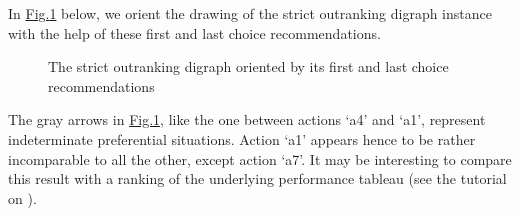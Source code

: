 \documentclass[a4paper,12pt,english]{sphinxhowto}
\let\sphinxpxdimen\pdfpxdimen\else\newdimen\sphinxpxdimen
\begin{document}
\sphinxAtStartPar
In \hyperref[\detokenize{pearls:bestworstorientation}]{Fig.\@ \ref{\detokenize{pearls:bestworstorientation}}} below, we orient the drawing of the strict outranking digraph instance with the help of these first and last choice recommendations.

\begin{sphinxVerbatim}[commandchars=\\\{\},numbers=left,firstnumber=1,stepnumber=1]
                   \PYG{p}{[}\PYG{p}{]}
                   \PYG{p}{[}\PYG{p}{]}
\end{sphinxVerbatim}

\begin{figure}[H]
\centering
\capstart

\noindent\sphinxincludegraphics[width=300\sphinxpxdimen]{{bestWorstOrientation}.png}
\caption{The strict outranking digraph oriented by its first and last choice recommendations}\label{\detokenize{pearls:bestworstorientation}}\end{figure}

\sphinxAtStartPar
The gray arrows in \hyperref[\detokenize{pearls:bestworstorientation}]{Fig.\@ \ref{\detokenize{pearls:bestworstorientation}}}, like the one between actions ‘a4’ and ‘a1’, represent indeterminate preferential situations. Action ‘a1’ appears hence to be rather incomparable to all the other, except action ‘a7’. It may be interesting to compare this result with a  ranking of the underlying performance tableau (see the tutorial on ).

\begin{sphinxVerbatim}[commandchars=\\\{\},numbers=left,firstnumber=1,stepnumber=1]
 
             
\end{sphinxVerbatim}
\end{document}
